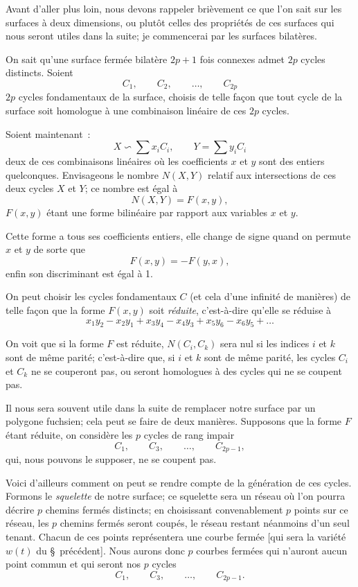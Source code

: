 \documentclass{article}
\begin{document}
Avant d'aller plus loin, nous devons rappeler brièvement ce que l'on sait sur les surfaces à deux dimensions, ou plutôt celles des propriétés de ces surfaces qui nous seront utiles dans la suite; je commencerai par les surfaces bilatères.

On sait qu'une surface fermée bilatère $2p + 1$ fois connexes admet $2p$ cycles distincts. Soient
\[ C_{1}, \qquad C_{2}, \qquad \ldots, \qquad C_{2p} \]
$2p$ cycles fondamentaux de la surface, choisis de telle façon que tout cycle de la surface soit homologue à une combinaison linéaire de ces $2p$ cycles.

Soient maintenant~:
\[ X \backsim \sum x_{i} C_{i}, \qquad Y = \sum y_{i} C_{i} \]
deux de ces combinaisons linéaires où les coefficients $x$ et $y$ sont des entiers quelconques. Envisageons le nombre $N(X, Y)$ relatif aux intersections de ces deux cycles $X$ et $Y$; ce nombre est égal à
\[ N(X, Y) = F(x, y), \]
$F(x, y)$ étant une forme bilinéaire par rapport aux variables $x$ et $y$.


Cette forme a tous ses coefficients entiers, elle change de signe quand on permute $x$ et $y$ de sorte que
\[ F(x, y) = -F(y, x), \]
enfin son discriminant est égal à 1.

On peut choisir les cycles fondamentaux $C$ (et cela d'une infinité de manières) de telle façon que la forme $F(x, y)$ soit \emph{réduite}, c'est-à-dire qu'elle se réduise à
\[ x_{1}y_{2} - x_{2}y_{1} + x_{3}y_{4} - x_{4}y_{3} + x_{5}y_{6} - x_{6}y_{5} + \ldots \]

On voit que si la forme $F$ est réduite, $N(C_{i}, C_{k})$ sera nul si les indices $i$ et $k$ sont de même parité; c'est-à-dire que, si $i$ et $k$ sont de même parité, les cycles $C_{i}$ et $C_{k}$ ne se couperont pas, ou seront homologues à des cycles qui ne se coupent pas.

Il nous sera souvent utile dans la suite de remplacer notre surface par un polygone fuchsien; cela peut se faire de deux manières. Supposons que la forme $F$ étant réduite, on considère les $p$ cycles de rang impair
\[ C_{1}, \qquad C_{3}, \qquad \ldots, \qquad C_{2p-1}, \]
qui, nous pouvons le supposer, ne se coupent pas.

Voici d'ailleurs comment on peut se rendre compte de la génération de ces cycles. Formons le \emph{squelette} de notre surface; ce squelette sera un réseau où l'on pourra décrire $p$ chemins fermés distincts; en choisissant convenablement $p$ points sur ce réseau, les $p$ chemins fermés seront coupés, le réseau restant néanmoins d'un seul tenant. Chacun de ces points représentera une courbe fermée [qui sera la variété $w(t)$ du \S\ précédent]. Nous aurons donc $p$ courbes fermées qui n'auront aucun point commun et qui seront nos $p$ cycles
\[ C_{1}, \qquad C_{3}, \qquad \ldots, \qquad C_{2p-1}. \]
\end{document}
